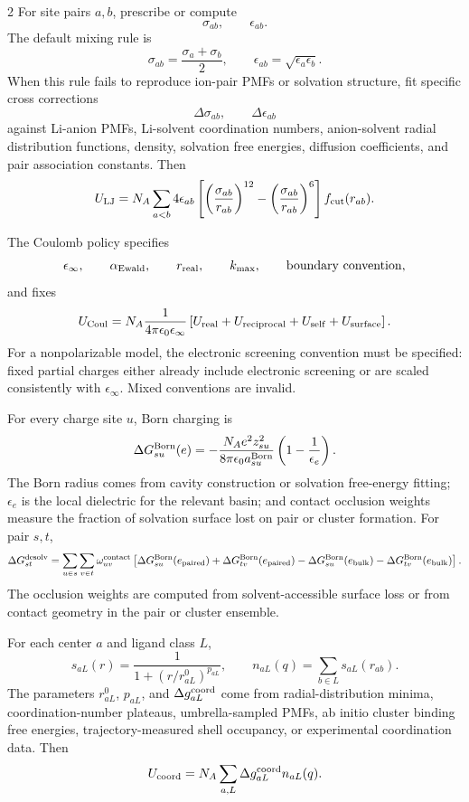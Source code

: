 \documentclass[10pt]{article}
\begin{document}
\begin{multicols}{2}
For site pairs \(a,b\), prescribe or compute
\[
\sigma_{ab},\qquad \epsilon_{ab}.
\]
The default mixing rule is
\[
\sigma_{ab}=\frac{\sigma_a+\sigma_b}{2},
\qquad
\epsilon_{ab}=\sqrt{\epsilon_a\epsilon_b}.
\]
When this rule fails to reproduce ion-pair PMFs or solvation structure, fit
specific cross corrections
\[
\Delta\sigma_{ab},\qquad \Delta\epsilon_{ab}
\]
against Li-anion PMFs, Li-solvent coordination numbers, anion-solvent radial
distribution functions, density, solvation free energies, diffusion
coefficients, and pair association constants. Then
\[
U_{\rm LJ}
=
N_A\sum_{a<b}
4\epsilon_{ab}
\left[
\left(\frac{\sigma_{ab}}{r_{ab}}\right)^{12}
-
\left(\frac{\sigma_{ab}}{r_{ab}}\right)^6
\right]f_{\rm cut}(r_{ab}).
\]

The Coulomb policy specifies
\[
\epsilon_\infty,\qquad
\alpha_{\rm Ewald},\qquad
r_{\rm real},\qquad
k_{\max},\qquad
{\rm boundary\ convention},
\]
and fixes
\[
U_{\rm Coul}
=
N_A\frac{1}{4\pi\epsilon_0\epsilon_\infty}
\left[
U_{\rm real}
+U_{\rm reciprocal}
+U_{\rm self}
+U_{\rm surface}
\right].
\]
For a nonpolarizable model, the electronic screening convention must be
specified: fixed partial charges either already include electronic screening or
are scaled consistently with \(\epsilon_\infty\). Mixed conventions are invalid.

For every charge site \(u\), Born charging is
\[
\Delta G_{su}^{\rm Born}(e)
=
-\frac{N_Ae^2z_{su}^2}
{8\pi\epsilon_0a_{su}^{\rm Born}}
\left(1-\frac{1}{\epsilon_e}\right).
\]
The Born radius comes from cavity construction or solvation free-energy fitting;
\(\epsilon_e\) is the local dielectric for the relevant basin; and contact
occlusion weights measure the fraction of solvation surface lost on pair or
cluster formation. For pair \(s,t\),
\[
\Delta G_{st}^{\rm desolv}
=
\sum_{u\in s}\sum_{v\in t}
\omega_{uv}^{\rm contact}
\left[
\Delta G_{su}^{\rm Born}(e_{\rm paired})
+\Delta G_{tv}^{\rm Born}(e_{\rm paired})
-\Delta G_{su}^{\rm Born}(e_{\rm bulk})
-\Delta G_{tv}^{\rm Born}(e_{\rm bulk})
\right].
\]
The occlusion weights are computed from solvent-accessible surface loss or
from contact geometry in the pair or cluster ensemble.

For each center \(a\) and ligand class \(L\),
\[
s_{aL}(r)=\frac{1}{1+(r/r_{aL}^0)^{p_{aL}}},
\qquad
n_{aL}(q)=\sum_{b\in L}s_{aL}(r_{ab}).
\]
The parameters \(r_{aL}^0\), \(p_{aL}\), and \(\Delta g_{aL}^{\rm coord}\)
come from radial-distribution minima, coordination-number plateaus,
umbrella-sampled PMFs, ab initio cluster binding free energies,
trajectory-measured shell occupancy, or experimental coordination data. Then
\[
U_{\rm coord}
=
N_A\sum_{a,L}\Delta g_{aL}^{\rm coord}n_{aL}(q).
\]


\end{multicols}
\end{document}
